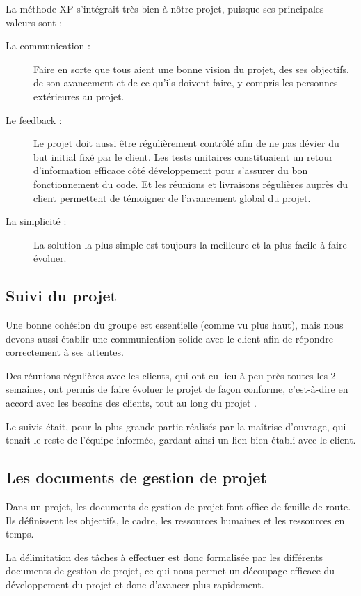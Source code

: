     La méthode XP s'intégrait très bien à nôtre projet, puisque ses principales
    valeurs sont :
    \begin{description}
      \item[La communication :] Faire en sorte que tous aient une bonne vision
      du projet, des ses objectifs, de son avancement et de ce qu'ils doivent
      faire, y compris les personnes extérieures au projet.
      \item[Le feedback :] Le projet doit aussi être régulièrement contrôlé
      afin de ne pas dévier du but initial fixé par le client. Les tests
      unitaires constituaient un retour d'information efficace côté
      développement pour s'assurer du bon fonctionnement du code. Et les
      réunions et livraisons régulières auprès du client permettent de
      témoigner de l'avancement global du projet.
      \item[La simplicité :] La solution la plus simple est toujours la
      meilleure et la plus facile à faire évoluer.
    \end{description}


  \subsection{Suivi du projet}

    Une bonne cohésion du groupe est essentielle (comme vu plus haut), mais
    nous devons aussi établir une communication solide avec le client afin de
    répondre correctement à ses attentes.

    Des réunions régulières avec les clients, qui ont eu lieu à peu près toutes
    les 2 semaines, ont permis de faire évoluer le projet de façon conforme,
    c'est-à-dire en accord avec les besoins des clients, tout au long du projet
    .

    Le suivis était, pour la plus grande partie réalisés par la maîtrise
    d'ouvrage, qui tenait le reste de l'équipe informée, gardant ainsi un lien
    bien établi avec le client.


  \subsection{Les documents de gestion de projet}

    Dans un projet, les documents de gestion de projet font office de feuille
    de route. Ils définissent les objectifs, le cadre, les ressources humaines
    et les ressources en temps.

    La délimitation des tâches à effectuer est donc formalisée par les
    différents documents de gestion de projet, ce qui nous permet un découpage
    efficace du développement du projet et donc d'avancer plus rapidement.

